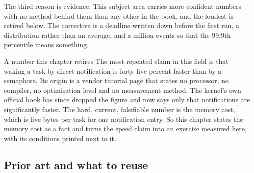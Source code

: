 The third reason is evidence. This subject area carries more confident numbers
with no method behind them than any other in the book, and the loudest is
retired below. The corrective is a deadline written down before the first run,
a distribution rather than an average, and a million events so that the 99.9th
percentile means something.

\begin{note}{A number this chapter retires}
The most repeated claim in this field is that waking a task by direct
notification is forty-five percent faster than by a semaphore. Its origin is a
vendor tutorial page that states no processor, no compiler, no optimisation
level and no measurement method. The kernel's own official book has since
dropped the figure and now says only that notifications are significantly
faster. The hard, current, falsifiable number is the memory cost, which is
five bytes per task for one notification entry. So this chapter states the
memory cost as a fact and turns the speed claim into an exercise measured here,
with its conditions printed next to it.
\end{note}

\subsection*{Prior art and what to reuse}

